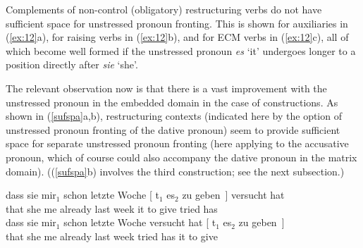 \documentclass[output=paper]{langsci/langscibook}
\begin{document}
Complements of non-control (obligatory) restructuring verbs do not have
sufficient space for unstressed pronoun fronting. This is shown for auxiliaries
in (\ref{ex:12}a), for raising verbs in (\ref{ex:12}b), and for ECM verbs in
(\ref{ex:12}c), all of which become well formed if the unstressed pronoun {\it
es} \enquote*{it} undergoes longer  to a position directly after {\it sie}
\enquote*{she}.

\ea\label{ex:12} 
    \z
\z

The relevant observation now is that there is a vast improvement with the
unstressed pronoun in the embedded domain in the case of  constructions.
As shown in (\ref{sufspa}a,b), restructuring contexts (indicated here by the
option of unstressed pronoun fronting of the dative pronoun)  seem to provide
sufficient space for separate unstressed pronoun fronting (here applying to the
accusative pronoun, which of course could also accompany the dative pronoun in
the matrix domain).  ((\ref{sufspa}b) involves the third construction; see the
next subsection.)

\ea\label{sufspa} 
    \ea \gll dass sie  mir$_1$ schon letzte Woche [ t$_1$ es$_2$ zu geben~]
    versucht hat\\
    that she\textsubscript{\Nom} me\textsubscript{\Dat} already last week {} {} it\textsubscript{\Acc} to give tried has\\
    \ex \gll dass sie  mir$_1$ schon letzte Woche versucht hat [ t$_1$ es$_2$ zu
      geben~]\\
    that she\textsubscript{\Nom} me\textsubscript{\Dat} already last week tried has {} {} it\textsubscript{\Acc} to
    give\\
    \z
\z
\end{document}
